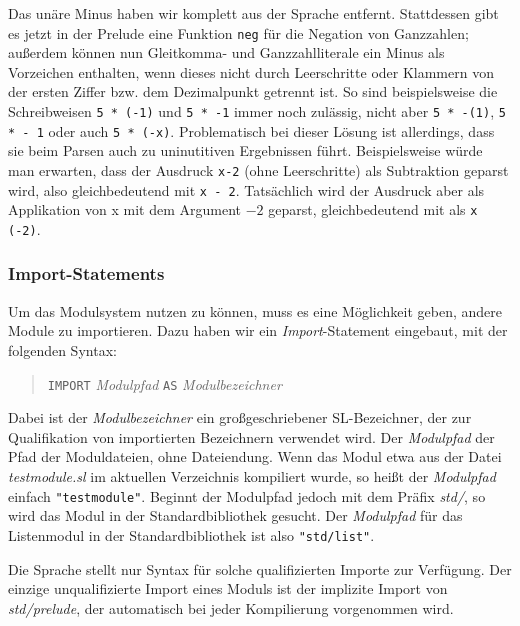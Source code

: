 \documentclass[runningheads]{llncs}
\begin{document}
Das unäre Minus haben wir komplett aus der Sprache entfernt.
Stattdessen gibt es jetzt in der Prelude eine Funktion \verb|neg| für
die Negation von Ganzzahlen; außerdem können nun Gleitkomma- und
Ganzzahlliterale ein Minus als Vorzeichen enthalten, wenn dieses nicht
durch Leerschritte oder Klammern von der ersten Ziffer bzw. dem
Dezimalpunkt getrennt ist.  So sind beispielsweise die Schreibweisen
\verb|5 * (-1)| und \verb|5 * -1| immer noch zulässig, nicht aber
\verb|5 * -(1)|, \verb|5 * - 1| oder auch \verb|5 * (-x)|.
Problematisch bei dieser Lösung ist allerdings, dass sie beim Parsen
auch zu uninutitiven Ergebnissen führt.  Beispielsweise würde man
erwarten, dass der Ausdruck \verb|x-2| (ohne Leerschritte) als
Subtraktion geparst wird, also gleichbedeutend mit \verb|x - 2|.
Tatsächlich wird der Ausdruck aber als Applikation von x mit dem
Argument $-2$ geparst, gleichbedeutend mit als \verb|x (-2)|.

\subsubsection{Import-Statements}

Um das Modulsystem nutzen zu können, muss es eine Möglichkeit geben,
andere Module zu importieren.  Dazu haben wir ein
\emph{Import}-Statement eingebaut, mit der folgenden Syntax:

\begin{quote}
\verb|IMPORT| \emph{Modulpfad} \verb|AS| \emph{Modulbezeichner}
\end{quote}

Dabei ist der \emph{Modulbezeichner} ein großgeschriebener
SL-Bezeichner, der zur Qualifikation von importierten Bezeichnern
verwendet wird.  Der \emph{Modulpfad} der Pfad der Moduldateien, ohne
Dateiendung.  Wenn das Modul etwa aus der Datei
\emph{testmodule.sl} im aktuellen Verzeichnis kompiliert wurde, so
heißt der \emph{Modulpfad} einfach \verb|"testmodule"|.  Beginnt der
Modulpfad jedoch mit dem Präfix \emph{std/}, so wird das Modul in der
Standardbibliothek gesucht.  Der \emph{Modulpfad} für das Listenmodul
in der Standardbibliothek ist also \verb|"std/list"|.

Die Sprache stellt nur Syntax für solche qualifizierten Importe zur
Verfügung.  Der einzige unqualifizierte Import eines Moduls ist der
implizite Import von \emph{std/prelude}, der automatisch bei jeder
Kompilierung vorgenommen wird.
\end{document}
